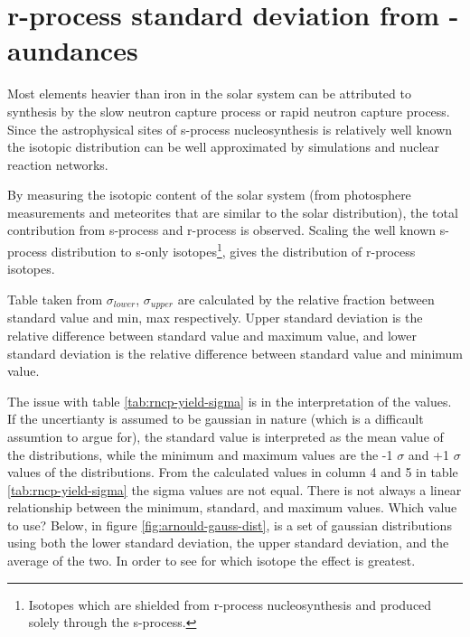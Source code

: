 \section{r-process standard deviation from \sos-aundances}
Most elements heavier than iron in the solar system can be attributed to synthesis by the slow neutron capture process or rapid neutron capture process. Since the astrophysical sites of s-process nucleosynthesis is relatively well known the isotopic distribution can be well approximated by simulations and nuclear reaction networks.

By measuring the isotopic content of the solar system (from photosphere measurements and meteorites that are similar to the solar distribution), the total contribution from s-process and r-process is observed. Scaling the well known s-process distribution to s-only isotopes\footnote{Isotopes which are shielded from r-process nucleosynthesis and produced solely through the s-process.}, gives the distribution of r-process isotopes.

\begin{table}
  
  \caption{\label{tab:rncp-yield-sigma}
    Table taken from 
    $\sigma_{lower}$, $\sigma_{upper}$ are calculated by the relative fraction between standard value and min, max respectively.
    Upper standard deviation is the relative difference between standard value and maximum value, and lower standard deviation is the relative difference between standard value and minimum value.
  }
\end{table}
\FloatBarrier

The issue with table \ref{tab:rncp-yield-sigma} is in the interpretation of the values. If the uncertianty is assumed to be gaussian in nature (which is a difficault assumtion to argue for), the standard value is interpreted as the mean value of the distributions, while the minimum and maximum values are the -1 $\sigma$ and +1 $\sigma$ values of the distributions. From the calculated values in column 4 and 5 in table \ref{tab:rncp-yield-sigma} the sigma values are not equal. There is not always a linear relationship between the minimum, standard, and maximum values.
Which value to use? Below, in figure \ref{fig:arnould-gauss-dist}, is a set of gaussian distributions using both  the lower standard deviation, the upper standard deviation, and the average of the two.
In order to see for which isotope the effect is greatest.

